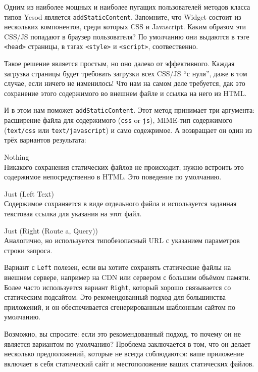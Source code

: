 Одним из наиболее мощных и наиболее пугащих пользователей методов класса типов Yesod является \lstinline!addStaticContent!. Запомните, что Widget состоит из нескольких компонентов, среди которых CSS и Javascript. Каким образом эти CSS/JS попадают в браузер пользователя? По умолчанию они выдаются в тэге \lstinline!<head>! страницы, в тэгах \lstinline!<style>! и \lstinline!<script>!, соотвественно.

Такое решение является простым, но оно далеко от эффективного. Каждая загрузка страницы будет требовать загрузки всех CSS/JS ``с нуля'', даже в том случае, если ничего не изменилось! Что нам на самом деле требуется, дак это сохранение этого содержимого во внешнем файле и ссылка на него из HTML.

И в этом нам поможет \lstinline!addStaticContent!. Этот метод принимает три аргумента: расширение файла для содержимого (\lstinline!css! or \lstinline!js!), MIME-тип содержимого (\lstinline!text/css! или \lstinline!text/javascript!) и само содежримое. А возвращает он один из трёх вариантов результата:

\begin{description}
  \item {Nothing}  \hfill \\
    Никакого сохранения статических файлов не происходит; нужно встроить это содержимое непосредственно в HTML. Это поведение по умолчанию.
  \item {Just (Left Text)} \hfill \\
    Содержимое сохраняется в виде отдельного файла и используется заданная текстовая ссылка для указания на этот файл.
  \item {Just (Right (Route a, Query))} \hfill \\
    Аналогично, но используется типобезопасный URL с указанием параметров строки запроса.
\end{description}

Вариант с \lstinline!Left! полезен, если вы хотите сохранять статические файлы на внешнем сервере, например на CDN или сервером с большим объёмом памяти. Более часто используется вариант \lstinline!Right!, который хорошо связывается со статическим подсайтом. Это рекомендованный подход для большинства приложений, и он обеспечивается сгенерированным шаблонным сайтом по умолчанию.

\begin{remark}
Возможно, вы спросите: если это рекомендованный подход, то почему он не является вариантом по умолчанию? Проблема заключается в том, что он делает несколько предположений, которые не всегда соблюдаются: ваше приложение включает в себя статический сайт и местоположение ваших статических файлов.
\end{remark}

